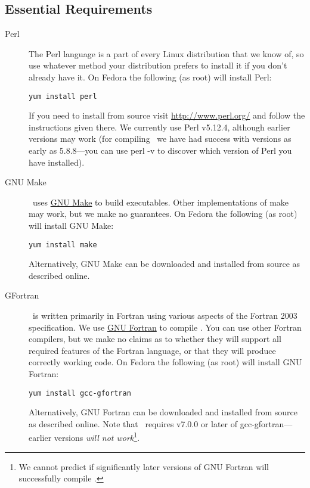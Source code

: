 \subsection{Essential Requirements}\label{sec:requirementsEssential}

\begin{description}
 \item [Perl] The Perl language is a part of every Linux distribution that we know of, so use whatever method your distribution prefers to install it if you don't already have it. On Fedora the following (as root) will install Perl:
\begin{verbatim}
yum install perl
\end{verbatim}
If you need to install from source visit \href{http://www.perl.org/}{\normalfont \ttfamily http://www.perl.org/} and follow the instructions given there. We currently use Perl v5.12.4, although earlier versions may work (for compiling \glc\ we have had success with versions as early as 5.8.8---you can use {\normalfont \ttfamily perl -v} to discover which version of Perl you have installed).

\item [GNU Make] \glc\ uses \href{http://www.gnu.org/software/make/}{GNU Make} to build executables. Other implementations of {\normalfont \ttfamily make} may work, but we make no guarantees. On Fedora the following (as root) will install GNU Make:
\begin{verbatim}
yum install make
\end{verbatim}
Alternatively, GNU Make can be downloaded and installed from source as described online.

\item [GFortran] \glc\ is written primarily in Fortran using various aspects of the Fortran 2003 specification. We use \href{http://gcc.gnu.org/fortran/}{GNU Fortran} to compile \glc. You can use other Fortran compilers, but we make no claims as to whether they will support all required features of the Fortran language, or that they will produce correctly working code. On Fedora the following (as root) will install GNU Fortran:
\begin{verbatim}
yum install gcc-gfortran
\end{verbatim}
Alternatively, GNU Fortran can be downloaded and installed from source as described online. Note that \glc\ requires v7.0.0 or later of {\normalfont \ttfamily gcc-gfortran}---earlier versions \emph{will not work}\footnote{We cannot predict if significantly later versions of GNU Fortran will successfully compile \protect\glc.}.


\end{description}
